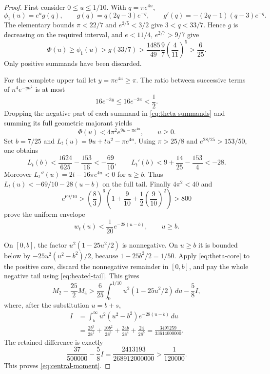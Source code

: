 \documentclass[11pt]{article}
\numberwithin{equation}{section}
\theoremstyle{definition}
\theoremstyle{remark}
\begin{document}
\begin{proof}
First consider \(0\leq u\leq1/10\).  With \(q=\pi e^{4u}\),
\[
 \phi_1(u)=e^u g(q),\qquad
 g(q)=q(2q-3)e^{-q},\qquad
 g'(q)=-(2q-1)(q-3)e^{-q}.
\]
The elementary bounds \(\pi<22/7\) and \(e^{2/5}<3/2\) give
\(3<q<33/7\).  Hence \(g\) is decreasing on the required interval,
and \(e<11/4\), \(e^{2/7}>9/7\) give
\begin{equation}
 \Phi(u)\geq\phi_1(u)>g(33/7)
 >\frac{1485}{49}\frac97\left(\frac4{11}\right)^5
 >\frac6{25}.
 \label{eq:theta-core}
\end{equation}
Only positive summands have been discarded.

For the complete upper tail let \(y=\pi e^{4u}\geq\pi\).
The ratio between successive terms of \(n^4e^{-yn^2}\) is at most
\[
 16e^{-3y}\leq16e^{-3\pi}<\frac12.
\]
Dropping the negative part of each summand in
\eqref{eq:theta-summands} and summing its full geometric majorant yields
\begin{equation}
 \Phi(u)<4\pi^2e^{9u-\pi e^{4u}},\qquad u\geq0.
 \label{eq:complete-theta-majorant}
\end{equation}
Set \(b=7/25\) and \(L_t(u)=9u+tu^2-\pi e^{4u}\).
Using \(\pi>25/8\) and \(e^{28/25}>153/50\), one obtains
\[
 L_t(b)<\frac{1624}{625}-\frac{153}{16}<-\frac{69}{10},
 \qquad
 L_t'(b)<9+\frac{14}{25}-\frac{153}{4}<-28.
\]
Moreover \(L_t''(u)=2t-16\pi e^{4u}<0\) for \(u\geq b\).
Thus \(L_t(u)<-69/10-28(u-b)\) on the full tail.
Finally \(4\pi^2<40\) and
\[
 e^{69/10}>
 \left(\frac83\right)^6
 \left(1+\frac9{10}+\frac12\left(\frac9{10}\right)^2\right)>800
\]
prove the uniform envelope
\begin{equation}
 w_t(u)<\frac1{20}e^{-28(u-b)},\qquad u\geq b.
 \label{eq:heated-tail}
\end{equation}

On \([0,b]\), the factor \(u^2(1-25u^2/2)\) is nonnegative.
On \(u\geq b\) it is bounded below by
\(-25u^2(u^2-b^2)/2\), because \(1-25b^2/2=1/50\).
Apply \eqref{eq:theta-core} to the positive core,
discard the nonnegative remainder in \([0,b]\), and pay the whole
negative tail using \eqref{eq:heated-tail}.  This gives
\[
 M_2-\frac{25}{2}M_4>
 \frac6{25}\int_0^{1/10}u^2(1-25u^2/2)\,du-\frac58 I,
\]
where, after the substitution \(u=b+s\),
\begin{align*}
 I&=\int_b^\infty u^2(u^2-b^2)e^{-28(u-b)}\,du\\
  &=\frac{2b^3}{28^2}+\frac{10b^2}{28^3}
    +\frac{24b}{28^4}+\frac{24}{28^5}
    =\frac{3497259}{33614000000}.
\end{align*}
The retained difference is exactly
\[
 \frac{37}{500000}-\frac58 I
 =\frac{2413193}{268912000000}>\frac1{120000}.
\]
This proves \eqref{eq:central-moment}.
\end{proof}
\end{document}
